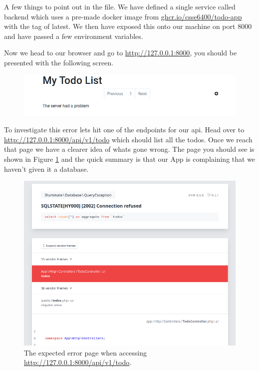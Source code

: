 \documentclass{csse4400}
\begin{document}
A few things to point out in the file.
We have defined a single service called backend which uses a pre-made docker image from \url{ghcr.io/csse6400/todo-app} with the tag of latest.
We then have exposed this onto our machine on port 8000 and have passed a few environment variables.%


Now we head to our browser and go to \url{http://127.0.0.1:8000},
you should be presented with the following screen.

\begin{figure}[ht]
\includegraphics[width=\textwidth]{images/app-missing-db}
\end{figure}

To investigate this error lets hit one of the endpoints for our api.
Head over to \url{http://127.0.0.1:8000/api/v1/todo} which should list all the todos.
Once we reach that page we have a clearer idea of whats gone wrong.
The page you should see is shown in Figure \ref{fig:expected-error} and the quick summary is that our App is complaining that we haven't given it a database.

\begin{figure}[H]
\includegraphics[width=\textwidth]{images/missing-db}
\caption{The expected error page when accessing \url{http://127.0.0.1:8000/api/v1/todo}.}
\label{fig:expected-error}
\end{figure}
\end{document}
